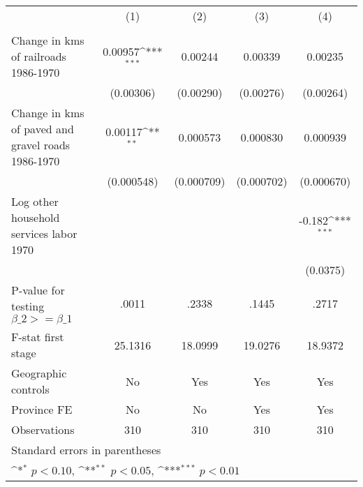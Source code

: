 {
\def\sym#1{\ifmmode^{#1}\else\(^{#1}\)\fi}
\begin{tabular}{l*{4}{c}}
\hline\hline
                &\multicolumn{1}{c}{(1)}&\multicolumn{1}{c}{(2)}&\multicolumn{1}{c}{(3)}&\multicolumn{1}{c}{(4)}\\
                &\multicolumn{1}{c}{}&\multicolumn{1}{c}{}&\multicolumn{1}{c}{}&\multicolumn{1}{c}{}\\
\hline
Change in kms of railroads 1986-1970&  0.00957\sym{***}&  0.00244         &  0.00339         &  0.00235         \\
                &(0.00306)         &(0.00290)         &(0.00276)         &(0.00264)         \\
[1em]
Change in kms of paved and gravel roads 1986-1970&  0.00117\sym{**} & 0.000573         & 0.000830         & 0.000939         \\
                &(0.000548)         &(0.000709)         &(0.000702)         &(0.000670)         \\
[1em]
Log other household services labor 1970&                  &                  &                  &   -0.182\sym{***}\\
                &                  &                  &                  & (0.0375)         \\
\hline
P-value for testing $\beta\_{2} >= \beta\_{1}$&    .0011         &    .2338         &    .1445         &    .2717         \\
F-stat first stage&  25.1316         &  18.0999         &  19.0276         &  18.9372         \\
Geographic controls&       No         &      Yes         &      Yes         &      Yes         \\
Province FE     &       No         &       No         &      Yes         &      Yes         \\
Observations    &      310         &      310         &      310         &      310         \\
\hline\hline
\multicolumn{5}{l}{\footnotesize Standard errors in parentheses}\\
\multicolumn{5}{l}{\footnotesize \sym{*} \(p<0.10\), \sym{**} \(p<0.05\), \sym{***} \(p<0.01\)}\\
\end{tabular}
}
